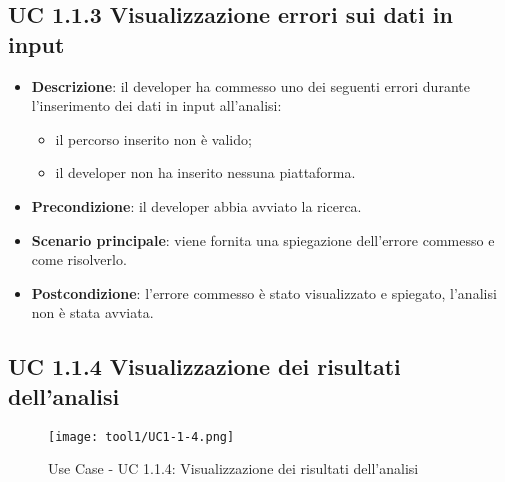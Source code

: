 	\subsection{UC 1.1.3 Visualizzazione errori sui dati in input}
		\label{subsec:UC1.1.3}
	
		\begin{itemize}
			\item\textbf{Descrizione}: il developer ha commesso uno dei seguenti errori durante l'inserimento dei dati in input all'analisi:
			\begin{itemize}
				\item il percorso inserito non è valido;
				\item il developer non ha inserito nessuna piattaforma.
			\end{itemize}
			\item\textbf{Precondizione}: il developer abbia avviato la ricerca.
			\item\textbf{Scenario principale}: viene fornita una spiegazione dell'errore commesso e come risolverlo.
			\item\textbf{Postcondizione}: l'errore commesso è stato visualizzato e spiegato, l'analisi non è stata avviata.
		\end{itemize}

	\subsection{UC 1.1.4 Visualizzazione dei risultati dell'analisi}
		\label{subsec:UC1.1.4}
		
		\begin{figure}[h!] 
			\centering 
			\texttt{[image: tool1/UC1-1-4.png]} 
			\caption{Use Case - UC 1.1.4: Visualizzazione dei risultati dell'analisi}
		\end{figure}
		

